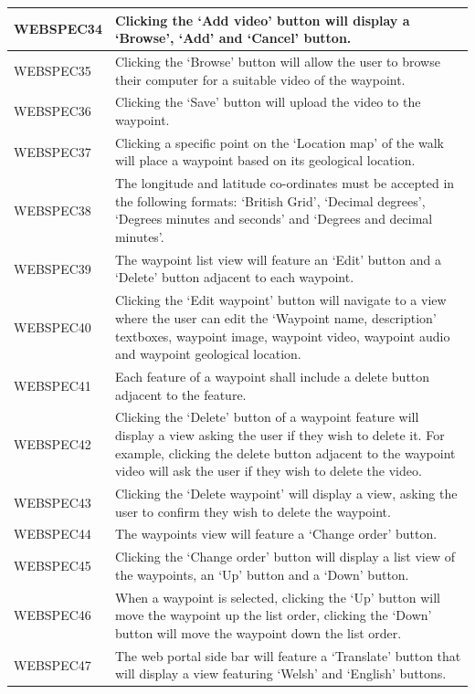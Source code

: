 \documentclass[11pt,a4paper]{article}
\begin{document}
\begin{longtable}{|p{2.5cm}p{13cm}|}
WEBSPEC34 & Clicking the `Add video' button will display a `Browse', `Add' and `Cancel' button. \\ \hline
WEBSPEC35 & Clicking the `Browse' button will allow the user to browse their computer for a suitable video of the waypoint. \\ \hline
WEBSPEC36 & Clicking the `Save' button will upload the video to the waypoint. \\ \hline
WEBSPEC37 & Clicking a specific point on the `Location map' of the walk will place a waypoint based on its geological location. \\ \hline
WEBSPEC38 & The longitude and latitude co-ordinates must be accepted in the following formats: `British Grid', `Decimal degrees', `Degrees minutes and seconds' and `Degrees and decimal minutes'. \\ \hline
WEBSPEC39 & The waypoint list view will feature an `Edit' button and a `Delete' button adjacent to each waypoint. \\ \hline
WEBSPEC40 & Clicking the `Edit waypoint' button will navigate to a view where the user can edit the `Waypoint name, description' textboxes, waypoint image, waypoint video, waypoint audio and waypoint geological location. \\ \hline
WEBSPEC41 & Each feature of a waypoint shall include a delete button adjacent to the feature. \\ \hline
WEBSPEC42 & Clicking the `Delete' button of a waypoint feature will display a view asking the user if they wish to delete it. For example, clicking the delete button adjacent to the waypoint video will ask the user if they wish to delete the video. \\ \hline
WEBSPEC43 & Clicking the `Delete waypoint' will display a view, asking the user to confirm they wish to delete the waypoint. \\ \hline
WEBSPEC44 & The waypoints view will feature a `Change order' button. \\ \hline
WEBSPEC45 & Clicking the `Change order' button will display a list view of the waypoints, an `Up' button and a `Down' button. \\ \hline
WEBSPEC46 & When a waypoint is selected, clicking the `Up' button will move the waypoint up the list order, clicking the `Down' button will move the waypoint down the list order. \\ \hline
WEBSPEC47 & The web portal side bar will feature a `Translate' button that will display a view featuring `Welsh' and `English' buttons. \\ \hline

\end{longtable}
\end{document}
